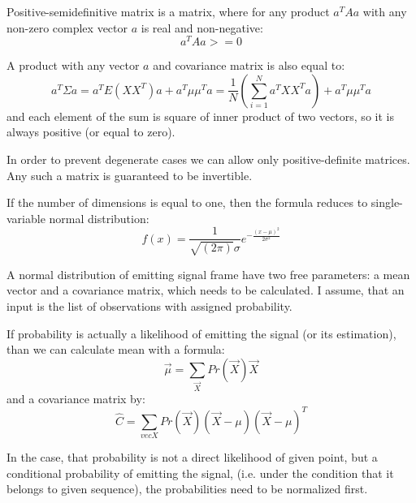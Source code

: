 \documentclass[12pt,a4paper,english]{article}
\begin{document}
Positive-semidefinitive matrix is a matrix, where for any product $a^T A a$ with any non-zero complex vector $a$ is real and non-negative:
\begin{equation}
    a^T A a >= 0
\end{equation}

A product with any vector $a$ and covariance matrix is also equal to: 
\begin{equation}
    a^T \Sigma a = a^T E(XX^T) a + a^T\mu\mu^T a = \frac 1 N (\sum_{i=1}^N a^T X X^T a) + a^T\mu\mu^T a
\end{equation}
and each element of the sum is square of inner product of two vectors, so it is always positive (or equal to zero). \newline

In order to prevent degenerate cases we can allow only positive-definite matrices. \newline
Any such a matrix is guaranteed to be invertible. \newline


If the number of dimensions is equal to one, then the formula reduces to single-variable normal distribution: 
\begin{equation}
    f(x) = \frac 1 {\sqrt{(2\pi)}\sigma}e^{-{ \frac {(x-\mu)^2}{2 \sigma^2}}}
\end{equation}


\newpage

A normal distribution of emitting signal frame have two free parameters: a mean vector and a covariance matrix,
which needs to be calculated.\newline
I assume, that an input is the list of observations with assigned probability.\newline 

If probability is actually a likelihood of emitting the signal (or its estimation),
than we can calculate mean with a formula:   
\begin{equation}
    \vec \mu = \sum_{\vec X} Pr(\vec X) \vec X
\end{equation}
and a covariance matrix by: 
\begin{equation}
    \hat C = \sum_{vec X} Pr(\vec X) (\vec X - \mu) (\vec X - \mu)^T
\end{equation}
\newline


In the case, that probability is not a direct likelihood of given point, but a conditional probability of emitting the signal,
(i.e. under the condition that it belongs to given sequence), the probabilities need to be normalized first. \newline
\end{document}
